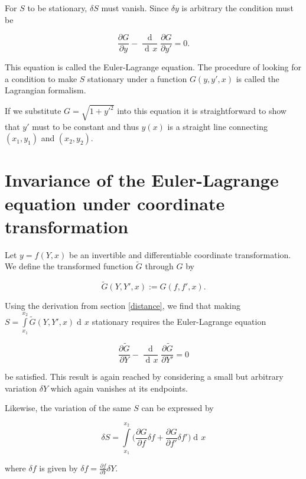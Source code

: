 \documentclass[prb,preprint]{revtex4-1}
\DeclareMathOperator{\dd}{d\!}
\DeclareMathOperator{\ddd}{\mathrm{d}}
\begin{document}
For $S$ to be stationary, $\delta S$ must vanish. Since $\delta y$ is arbitrary the condition must be


\begin{equation}\label{e-l}
\frac{\partial G}{\partial y} - \frac{\ddd}{\dd x}\frac{\partial G}{\partial y'} = 0.
\end{equation}

This equation is called the Euler-Lagrange equation. The procedure of looking for a condition to make $S$ stationary under a function $G(y,y',x)$ is called the Lagrangian formalism.

If we substitute $G = \sqrt{1+y'^2}$ into this equation it is straightforward to show that $y'$ must to be constant and thus $y(x)$ is a straight line connecting $(x_1,y_1)$ and $(x_2,y_2)$.

\section{Invariance of the Euler-Lagrange equation under coordinate transformation \cite{Kleinert}}

Let $y=f(Y,x)$ be an invertible and differentiable coordinate transformation. We define the transformed function $\widetilde{G}$ through $G$ by

\begin{equation}
\widetilde{G}(Y,Y',x) := G(f,f',x).
\end{equation}

Using the derivation from section \ref{distance}, we find that making $S = \int\limits_{x_1}^{x_2} \widetilde{G}(Y,Y',x) \dd x$ stationary requires the Euler-Lagrange equation

\begin{equation}
\frac{\partial \widetilde{G}}{\partial Y}
- \frac{\ddd}{\dd x}\frac{\partial \widetilde{G}}{\partial Y'} = 0
\end{equation}

be satisfied. This result is again reached by considering a small but arbitrary variation $\delta Y$ which again vanishes at its endpoints.

Likewise, the variation of the same $S$ can be expressed by

\begin{equation}
\delta S = \int\limits_{x_1}^{x_2} \bigg( \frac{\partial G}{\partial f} \delta f
+ \frac{\partial G}{\partial f'} \delta f' \bigg) \dd x
\end{equation}

where $\delta f$ is given by $\delta f = \frac{\partial f}{\partial Y} \delta Y$. 
\end{document}

